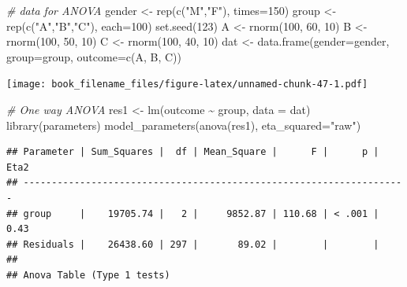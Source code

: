 \documentclass[
  ja=standard, xelatex, base=12pt]{bxjsreport}
\newenvironment{Shaded}{\begin{snugshade}}{\end{snugshade}}
\newcommand{\AttributeTok}[1]{\textcolor[rgb]{0.77,0.63,0.00}{#1}}
\newcommand{\CommentTok}[1]{\textcolor[rgb]{0.56,0.35,0.01}{\textit{#1}}}
\newcommand{\DecValTok}[1]{\textcolor[rgb]{0.00,0.00,0.81}{#1}}
\newcommand{\FunctionTok}[1]{\textcolor[rgb]{0.00,0.00,0.00}{#1}}
\newcommand{\NormalTok}[1]{#1}
\newcommand{\OtherTok}[1]{\textcolor[rgb]{0.56,0.35,0.01}{#1}}
\newcommand{\SpecialCharTok}[1]{\textcolor[rgb]{0.00,0.00,0.00}{#1}}
\newcommand{\StringTok}[1]{\textcolor[rgb]{0.31,0.60,0.02}{#1}}
\begin{document}
\begin{Shaded}
\begin{Highlighting}[]
\CommentTok{\# data for ANOVA}
\NormalTok{gender }\OtherTok{\textless{}{-}} \FunctionTok{rep}\NormalTok{(}\FunctionTok{c}\NormalTok{(}\StringTok{"M"}\NormalTok{,}\StringTok{"F"}\NormalTok{), }\AttributeTok{times=}\DecValTok{150}\NormalTok{)}
\NormalTok{group }\OtherTok{\textless{}{-}} \FunctionTok{rep}\NormalTok{(}\FunctionTok{c}\NormalTok{(}\StringTok{"A"}\NormalTok{,}\StringTok{"B"}\NormalTok{,}\StringTok{"C"}\NormalTok{), }\AttributeTok{each=}\DecValTok{100}\NormalTok{)}
\FunctionTok{set.seed}\NormalTok{(}\DecValTok{123}\NormalTok{)}
\NormalTok{A }\OtherTok{\textless{}{-}} \FunctionTok{rnorm}\NormalTok{(}\DecValTok{100}\NormalTok{, }\DecValTok{60}\NormalTok{, }\DecValTok{10}\NormalTok{)}
\NormalTok{B }\OtherTok{\textless{}{-}} \FunctionTok{rnorm}\NormalTok{(}\DecValTok{100}\NormalTok{, }\DecValTok{50}\NormalTok{, }\DecValTok{10}\NormalTok{)}
\NormalTok{C }\OtherTok{\textless{}{-}} \FunctionTok{rnorm}\NormalTok{(}\DecValTok{100}\NormalTok{, }\DecValTok{40}\NormalTok{, }\DecValTok{10}\NormalTok{)}
\NormalTok{dat }\OtherTok{\textless{}{-}} \FunctionTok{data.frame}\NormalTok{(}\AttributeTok{gender=}\NormalTok{gender, }\AttributeTok{group=}\NormalTok{group, }\AttributeTok{outcome=}\FunctionTok{c}\NormalTok{(A, B, C))}
\end{Highlighting}
\end{Shaded}

\texttt{[image: book\_filename\_files/figure-latex/unnamed-chunk-47-1.pdf]}

\begin{Shaded}
\begin{Highlighting}[]
\CommentTok{\# One way ANOVA}
\NormalTok{res1 }\OtherTok{\textless{}{-}} \FunctionTok{lm}\NormalTok{(outcome }\SpecialCharTok{\textasciitilde{}}\NormalTok{ group, }\AttributeTok{data =}\NormalTok{ dat)}
\FunctionTok{library}\NormalTok{(parameters)}
\FunctionTok{model\_parameters}\NormalTok{(}\FunctionTok{anova}\NormalTok{(res1), }\AttributeTok{eta\_squared=}\StringTok{"raw"}\NormalTok{)}
\end{Highlighting}
\end{Shaded}

\begin{verbatim}
## Parameter | Sum_Squares |  df | Mean_Square |      F |      p | Eta2
## --------------------------------------------------------------------
## group     |    19705.74 |   2 |     9852.87 | 110.68 | < .001 | 0.43
## Residuals |    26438.60 | 297 |       89.02 |        |        |     
## 
## Anova Table (Type 1 tests)
\end{verbatim}
\end{document}
